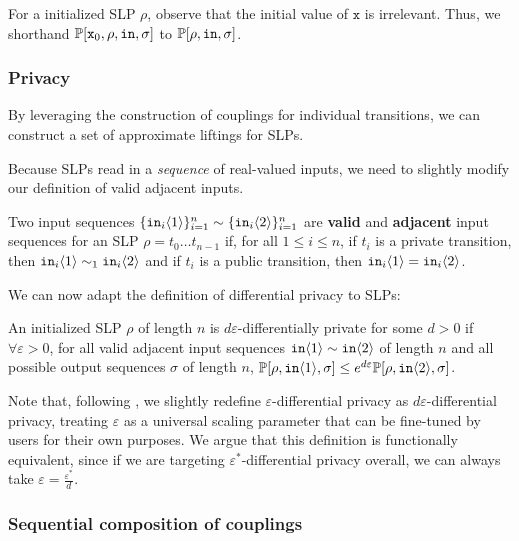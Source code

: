 For a initialized SLP $\rho$, observe that the initial value of $\texttt{x}$ is irrelevant. Thus, we shorthand $\mathbb{P}[\texttt{x}_0, \rho, \texttt{in}, \sigma]$ to $\mathbb{P}[\rho, \texttt{in}, \sigma]$.


\subsubsection{Privacy}

By leveraging the construction of couplings for individual transitions, we can construct a set of approximate liftings for SLPs.

Because SLPs read in a \textit{sequence} of real-valued inputs, we need to slightly modify our definition of valid adjacent inputs.

\begin{defn}
    Two input sequences $\{\texttt{in}_i\langle1 \rangle\}_{i=1}^n\sim\{\texttt{in}_i\langle2 \rangle\}_{i=1}^n$ are \textbf{valid} and \textbf{adjacent} input sequences for an SLP $\rho = t_0\ldots t_{n-1}$ if, for all $1\leq i\leq n$, if $t_i$ is a private transition, then $\texttt{in}_i\langle1 \rangle\sim_1\texttt{in}_i\langle2 \rangle$ and if $t_i$ is a public transition, then $\texttt{in}_i\langle1 \rangle=\texttt{in}_i\langle2 \rangle$.
\end{defn}

We can now adapt the definition of differential privacy to SLPs:
\begin{defn}
    An initialized SLP $\rho$ of length $n$ is $d\varepsilon$-differentially private for some $d>0$ if $\forall \varepsilon>0$, for all valid adjacent input sequences $\texttt{in}\langle1 \rangle\sim \texttt{in}\langle2 \rangle$ of length $n$ and all possible output sequences $\sigma$ of length $n$, $\mathbb{P}[\rho, \texttt{in}\langle1 \rangle, \sigma]\leq e^{d\varepsilon}\mathbb{P}[\rho, \texttt{in}\langle2 \rangle, \sigma]$.
\end{defn}

Note that, following \cite{chadhaLinearTimeDecidability2021}, we slightly redefine $\varepsilon$-differential privacy as $d\varepsilon$-differential privacy, treating $\varepsilon$ as a universal scaling parameter that can be fine-tuned by users for their own purposes. 
We argue that this definition is functionally equivalent, since if we are targeting $\varepsilon^*$-differential privacy overall, we can always take $\varepsilon = \frac{\varepsilon^*}{d}$.

\subsubsection{Sequential composition of couplings}

